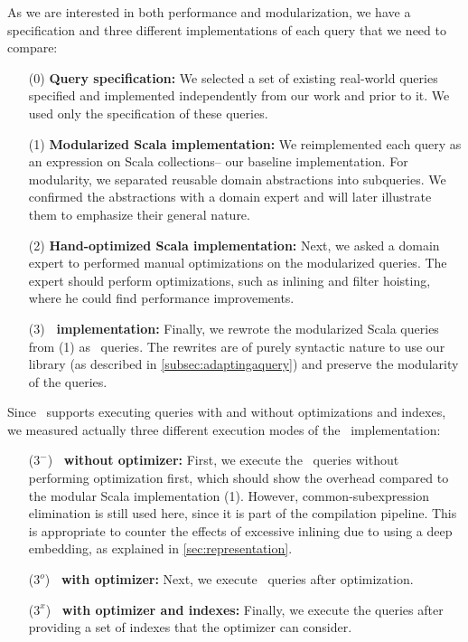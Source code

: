 \label{sec:implemenationsandspeedups}
As we are interested in both performance and modularization, we have a specification and three different implementations of each query that we need to compare:
\begin{enumerate}
	\item[(0)] \textbf{Query specification:} We selected a set of existing real-world queries specified and implemented independently from our work and prior to it. We used only the specification of these queries.

	\item[(1)] \textbf{Modularized Scala implementation:}
	We reimplemented each query as an expression on Scala collections\--- our baseline implementation. For modularity, we separated reusable domain abstractions into subqueries. We confirmed the abstractions with a domain expert and will later illustrate them to emphasize their general nature.
	\item[(2)] \textbf{Hand-optimized Scala implementation:} Next, we asked a domain expert to performed manual optimizations on the modularized queries. The expert should perform optimizations, such as inlining and filter hoisting, where he could find performance improvements.
	\item[(3)] \textbf{\LoS\ implementation:} Finally, we rewrote the modularized Scala queries from (1) as \LoS\ queries. The rewrites are of purely syntactic nature to use our library (as described in \cref{subsec:adaptingaquery}) and preserve the modularity of the queries.
\end{enumerate}

Since \LoS\ supports executing queries with and without optimizations and indexes, we measured actually three different execution modes of the \LoS\ implementation:
\begin{enumerate}
	\item[($3^-$)] \textbf{\LoS\ without optimizer:} First, we execute the \LoS\ queries without performing optimization first, which should show the \LoS{} overhead compared to the modular Scala implementation (1).
However, common-subexpression elimination is still used here, since it is part of the compilation pipeline. This is appropriate to counter the effects of excessive inlining due to using a deep embedding, as explained in \cref{sec:representation}.
	\item[($3^o$)] \textbf{\LoS\ with optimizer:} Next, we execute \LoS\ queries after optimization.
	\item[($3^x$)] \textbf{\LoS\ with optimizer and indexes:} Finally, we execute the queries after providing a set of indexes that the optimizer can consider.
\end{enumerate}

